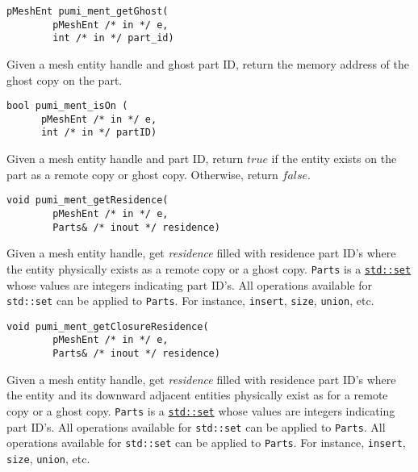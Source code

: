 \begin{verbatim}
pMeshEnt pumi_ment_getGhost(
        pMeshEnt /* in */ e, 
        int /* in */ part_id)
\end{verbatim}\vspace{-.5cm}\hspace{1cm}        
        Given a mesh entity handle and ghost part ID, return the memory address of the ghost copy on the part.

\begin{verbatim}
bool pumi_ment_isOn (
      pMeshEnt /* in */ e, 
      int /* in */ partID)
\end{verbatim}\vspace{-.5cm}\hspace{1cm}
        Given a mesh entity handle and part ID, return $true$ if the entity exists on the part as a remote copy or ghost copy. Otherwise, return $false$.

\begin{verbatim}
void pumi_ment_getResidence(
        pMeshEnt /* in */ e, 
        Parts& /* inout */ residence)
\end{verbatim}\vspace{-.5cm}\hspace{1cm}
        Given a mesh entity handle, get \emph{residence} filled with residence part ID's where the entity physically exists as a remote copy or a ghost copy. \texttt{Parts} is a \href{http://www.cplusplus.com/reference/set/set/}{\texttt{std::set}} whose values are integers indicating part ID's. All operations available for \texttt{std::set} can be applied to \texttt{Parts}. For instance, \texttt{insert}, \texttt{size}, \texttt{union}, etc.

\begin{verbatim}
void pumi_ment_getClosureResidence(
        pMeshEnt /* in */ e, 
        Parts& /* inout */ residence)
\end{verbatim}\vspace{-.5cm}\hspace{1cm}
        Given a mesh entity handle, get \emph{residence} filled with residence part ID's where the entity and its downward adjacent entities physically exist as for a remote copy or a ghost copy. \texttt{Parts} is a \href{http://www.cplusplus.com/reference/set/set/}{\texttt{std::set}} whose values are integers indicating part ID's. All operations available for \texttt{std::set} can be applied to \texttt{Parts}. All operations available for \texttt{std::set} can be applied to \texttt{Parts}. For instance, \texttt{insert}, \texttt{size}, \texttt{union}, etc.


